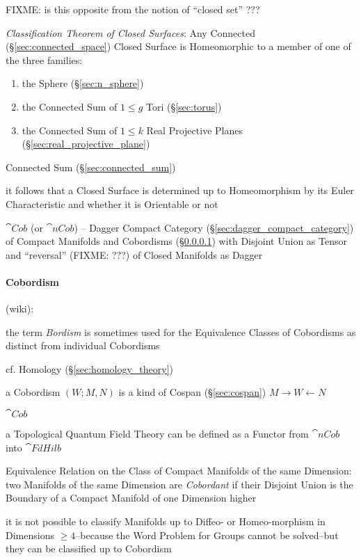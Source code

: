 FIXME: is this opposite from the notion of ``closed set'' ???

\emph{Classification Theorem of Closed Surfaces}: Any Connected
(\S\ref{sec:connected_space}) Closed Surface is Homeomorphic to a member of one
of the three families:
\begin{enumerate}
  \item the Sphere (\S\ref{sec:n_sphere})
  \item the Connected Sum of $1 \leq g$ Tori (\S\ref{sec:torus})
  \item the Connected Sum of $1 \leq k$ Real Projective Planes
    (\S\ref{sec:real_projective_plane})
\end{enumerate}
\fist Connected Sum (\S\ref{sec:connected_sum})

it follows that a Closed Surface is determined up to Homeomorphism by its Euler
Characteristic and whether it is Orientable or not

$\cat{Cob}$ (or $\cat{nCob}$) -- Dagger Compact Category
(\S\ref{sec:dagger_compact_category}) of Compact Manifolds and Cobordisms
(\S\ref{sec:cobordism}) with Disjoint Union as Tensor and ``reversal'' (FIXME:
???) of Closed Manifolds as Dagger



\paragraph{Cobordism}\label{sec:cobordism}\hfill

(wiki):

the term \emph{Bordism} is sometimes used for the Equivalence Classes of
Cobordisms as distinct from individual Cobordisms

cf. Homology (\S\ref{sec:homology_theory})

a Cobordism $(W; M, N)$ is a kind of Cospan (\S\ref{sec:cospan})
$M \rightarrow W \leftarrow N$

$\cat{Cob}$

a Topological Quantum Field Theory can be defined as a Functor from $\cat{nCob}$
into $\cat{FdHilb}$

Equivalence Relation on the Class of Compact Manifolds of the same Dimension:
two Manifolds of the same Dimension are \emph{Cobordant} if their Disjoint
Union is the Boundary of a Compact Manifold of one Dimension higher

it is not possible to classify Manifolds up to Diffeo- or Homeo-morphism in
Dimensions $\geq 4$--because the Word Problem for Groups cannot be solved--but
they can be classified up to Cobordism

